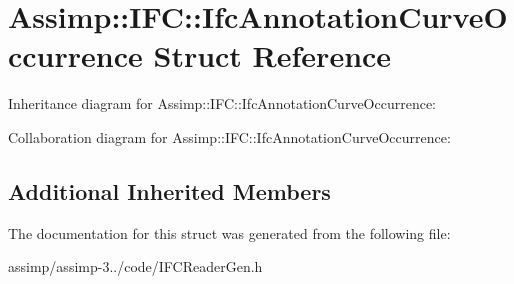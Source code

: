 \hypertarget{struct_assimp_1_1_i_f_c_1_1_ifc_annotation_curve_occurrence}{\section{Assimp\+:\+:I\+F\+C\+:\+:Ifc\+Annotation\+Curve\+Occurrence Struct Reference}
\label{struct_assimp_1_1_i_f_c_1_1_ifc_annotation_curve_occurrence}
}


Inheritance diagram for Assimp\+:\+:I\+F\+C\+:\+:Ifc\+Annotation\+Curve\+Occurrence\+:


Collaboration diagram for Assimp\+:\+:I\+F\+C\+:\+:Ifc\+Annotation\+Curve\+Occurrence\+:
\subsection*{Additional Inherited Members}


The documentation for this struct was generated from the following file\+:\begin{DoxyCompactItemize}
\item 
assimp/assimp-\/3../code/I\+F\+C\+Reader\+Gen.\+h\end{DoxyCompactItemize}
